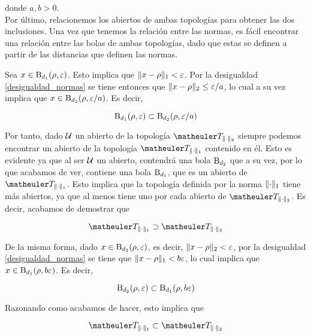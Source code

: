 donde $a,b>0$.\\



Por último, relacionemos los abiertos de ambas topologías para obtener las dos inclusiones. Una vez que tenemos la relación entre las normas, es fácil encontrar una relación entre las bolas de ambas topologías, dado que estas se definen a partir de las distancias que definen las normas.


Sea $x\in \operatorname{B}_{d_1}(\rho,\varepsilon)$. Esto implica que $\lVert x-\rho\rVert_1<\varepsilon$. Por la desigualdad \eqref{desigualdad_normas} se tiene entonces que $\lVert x-\rho\rVert_2\le\varepsilon/a$, lo cual a su vez implica que $x\in \operatorname{B}_{d_2}(\rho,\varepsilon/a)$. Es decir,

\begin{equation*}
\operatorname{B}_{d_1}(\rho,\varepsilon)\subset \operatorname{B}_{d_2}(\rho,\varepsilon/a)
\end{equation*}

Por tanto, dado $\mathcal{U}$ un abierto de la topología $\T_{\norm{\cdot}_2}$ siempre podemos encontrar un abierto de la topología $\T_{\norm{\cdot}_1}$ contenido en él. Esto es evidente ya que al ser $\mathcal{U}$ un abierto, contendrá una bola $\operatorname{B}_{d_2}$ que a su vez, por lo que acabamos de ver, contiene una bola $\operatorname{B}_{d_1}$, que es un abierto de $\T_{\norm{\cdot}_1}$. Esto implica que la topología definida por la norma $\lVert\cdot\rVert_1$ tiene más abiertos, ya que al menos tiene uno por cada abierto de $\T_{\norm{\cdot}_2}$. Es decir, acabamos de demostrar que

\begin{equation*}
\T_{\norm{\cdot}_1}\supset\T_{\norm{\cdot}_2}
\end{equation*}


De la misma forma, dado $x\in \operatorname{B}_{d_2}(\rho,\varepsilon)$, es decir, $\lVert x-\rho\rVert_2<\varepsilon$, por la desigualdad \eqref{desigualdad_normas} se tiene que $\lVert x-\rho\rVert_1<b\varepsilon$, lo cual implica que $x\in \operatorname{B}_{d_1}(\rho,b\varepsilon)$. Es decir,

\begin{equation*}
\operatorname{B}_{d_2}(\rho,\varepsilon)\subset \operatorname{B}_{d_1}(\rho,b\varepsilon)
\end{equation*}


Razonando como acabamos de hacer, esto implica que

\begin{equation*}
\T_{\norm{\cdot}_1}\subset\T_{\norm{\cdot}_2}
\end{equation*}

